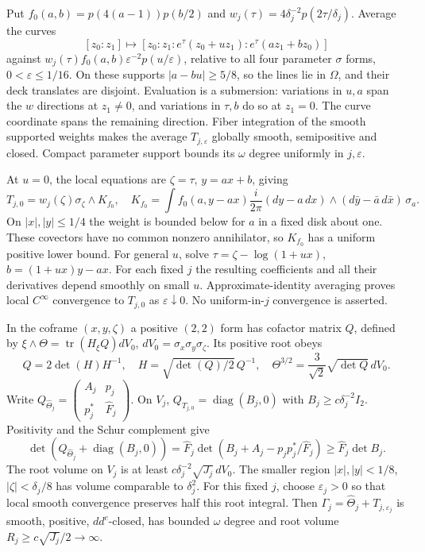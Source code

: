 \documentclass[11pt]{article}
\newcommand{\ddc}{dd^c}
\theoremstyle{remark}\newtheorem{remark}[theorem]{Remark}
\begin{document}
Put $f_0(a,b)=p(4(a-1))p(b/2)$ and
$w_j(\tau)=4\delta_j^{-2}p(2\tau/\delta_j)$. Average the curves
\[
 [z_0:z_1]\longmapsto
 [z_0:z_1:e^\tau(z_0+uz_1):e^\tau(az_1+bz_0)]
\]
against $w_j(\tau)f_0(a,b)\varepsilon^{-2}p(u/\varepsilon)$,
relative to all four parameter $\sigma$ forms, $0<\varepsilon\leq1/16$.
On these supports $|a-bu|\geq5/8$, so the lines lie in $\Omega$,
and their deck translates are disjoint. Evaluation is a submersion:
variations in $u,a$ span the $w$ directions at $z_1\ne0$, and
variations in $\tau,b$ do so at $z_1=0$. The curve coordinate spans
the remaining direction. Fiber integration of the smooth supported
weights makes the average $T_{j,\varepsilon}$ globally smooth,
semipositive and closed. Compact parameter support bounds its
$\omega$ degree uniformly in $j,\varepsilon$.

At $u=0$, the local equations are $\zeta=\tau$, $y=ax+b$, giving
\[
 T_{j,0}=w_j(\zeta)\sigma_\zeta\wedge K_{f_0},\quad
 K_{f_0}=\int f_0(a,y-ax)\frac{i}{2\pi}
 (dy-a\,dx)\wedge(d\bar y-\bar a\,d\bar x)\,\sigma_a.
\]
On $|x|,|y|\leq1/4$ the weight is bounded below for $a$ in a fixed
disk about one. These covectors have no common nonzero annihilator,
so $K_{f_0}$ has a uniform positive lower bound. For general $u$,
solve $\tau=\zeta-\log(1+ux)$, $b=(1+ux)y-ax$. For each fixed $j$
the resulting coefficients and all their derivatives depend smoothly
on small $u$. Approximate-identity averaging proves local $C^\infty$
convergence to $T_{j,0}$ as $\varepsilon\downarrow0$. No uniform-in-$j$
convergence is asserted.

In the coframe $(x,y,\zeta)$ a positive $(2,2)$ form has cofactor
matrix $Q$, defined by $\xi\wedge\Theta=\operatorname{tr}(H_\xi Q)dV_0$,
$dV_0=\sigma_x\sigma_y\sigma_\zeta$. Its positive root obeys
\[
 Q=2\det(H)H^{-1},\quad H=\sqrt{\det(Q)/2}\,Q^{-1},\quad
 \Theta^{3/2}=\frac3{\sqrt2}\sqrt{\det Q}\,dV_0.
\]
Write $Q_{\widehat\Theta_j}=\left(\begin{smallmatrix}A_j&p_j\\p_j^*&\widehat F_j\end{smallmatrix}\right)$.
On $V_j$, $Q_{T_{j,0}}=\operatorname{diag}(B_j,0)$ with
$B_j\geq c\delta_j^{-2}I_2$. Positivity and the Schur complement give
\[
 \det(Q_{\widehat\Theta_j}+\operatorname{diag}(B_j,0))
 =\widehat F_j\det(B_j+A_j-p_jp_j^*/\widehat F_j)
 \geq\widehat F_j\det B_j.
\]
The root volume on $V_j$ is at least
$c\delta_j^{-2}\sqrt{J_j}\,dV_0$. The smaller region
$|x|,|y|<1/8$, $|\zeta|<\delta_j/8$ has volume comparable to
$\delta_j^2$. For this fixed $j$, choose $\varepsilon_j>0$ so that
local smooth convergence preserves half this root integral. Then
$\Gamma_j=\widehat\Theta_j+T_{j,\varepsilon_j}$ is smooth, positive,
$\ddc$-closed, has bounded $\omega$ degree and root volume
$R_j\geq c\sqrt{J_j}/2\to\infty$.
\end{document}
